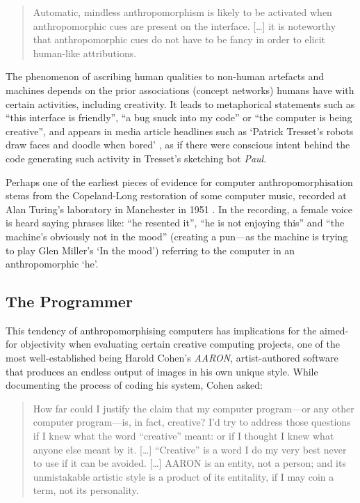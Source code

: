 \begin{quotation}
  Automatic, mindless anthropomorphism is likely to be activated when anthropomorphic cues are present on the interface. [\ldots] it is noteworthy that anthropomorphic cues do not have to be fancy in order to elicit human-like attributions. 
\end{quotation}

The phenomenon of ascribing human qualities to non-human artefacts and machines depends on the prior associations (concept networks) humans have with certain activities, including creativity. It leads to metaphorical statements such as ``this interface is friendly'', ``a bug snuck into my code'' or ``the computer is being creative'', and appears in media article headlines such as `Patrick Tresset\rq s robots draw faces and doodle when bored' \autocite{Wired2011}, as if there were conscious intent behind the code generating such activity in Tresset's sketching bot \textit{Paul}.

Perhaps one of the earliest pieces of evidence for computer anthropomorphisation stems from the Copeland-Long restoration of some computer music, recorded at Alan Turing's laboratory in Manchester in 1951 \autocite{Copeland2016}. In the recording, a female voice is heard saying phrases like: ``he resented it'', ``he is not enjoying this'' and ``the machine's obviously not in the mood'' (creating a pun---as the machine is trying to play Glen Miller's `In the mood') referring to the computer in an anthropomorphic `he'.


\subsection{The Programmer}
\label{s:programmer}

This tendency of anthropomorphising computers has implications for the aimed-for objectivity when evaluating certain creative computing projects, one of the most well-established being Harold Cohen's \textit{AARON}, artist-authored software that produces an endless output of images in his own unique style. While documenting the process of coding his system, Cohen asked:

\begin{quotation}
  How far could I justify the claim that my computer program---or any other computer program---is, in fact, creative? I'd try to address those questions if I knew what the word ``creative'' meant: or if I thought I knew what anyone else meant by it. [\ldots] ``Creative'' is a word I do my very best never to use if it can be avoided. [\ldots] AARON is an entity, not a person; and its unmistakable artistic style is a product of its entitality, if I may coin a term, not its personality. 
\end{quotation}

